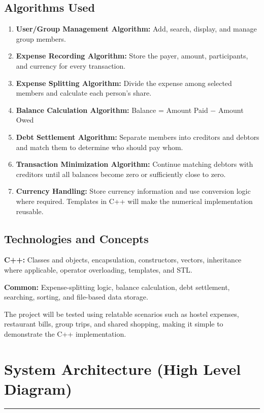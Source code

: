 \documentclass[11pt,a4paper]{article}
\begin{document}
\subsection*{Algorithms Used}

\begin{enumerate}[leftmargin=1.8em]
  \item \textbf{User/Group Management Algorithm:} Add, search, display, and manage group members.
  \item \textbf{Expense Recording Algorithm:} Store the payer, amount, participants, and currency for every transaction.
  \item \textbf{Expense Splitting Algorithm:} Divide the expense among selected members and calculate each person's share.
  \item \textbf{Balance Calculation Algorithm:} Balance = Amount Paid $-$ Amount Owed
  \item \textbf{Debt Settlement Algorithm:} Separate members into creditors and debtors and match them to determine who should pay whom.
  \item \textbf{Transaction Minimization Algorithm:} Continue matching debtors with creditors until all balances become zero or sufficiently close to zero.
  \item \textbf{Currency Handling:} Store currency information and use conversion logic where required. Templates in C++ will make the numerical implementation reusable.
\end{enumerate}

\subsection*{Technologies and Concepts}

\textbf{C++:} Classes and objects, encapsulation, constructors, vectors, inheritance where applicable, operator overloading, templates, and STL.

\textbf{Common:} Expense-splitting logic, balance calculation, debt settlement, searching, sorting, and file-based data storage.

The project will be tested using relatable scenarios such as hostel expenses, restaurant bills, group trips, and shared shopping, making it simple to demonstrate the C++ implementation.

\clearpage

\section*{System Architecture (High Level Diagram)}
\noindent\rule{\linewidth}{0.8pt}
\end{document}
